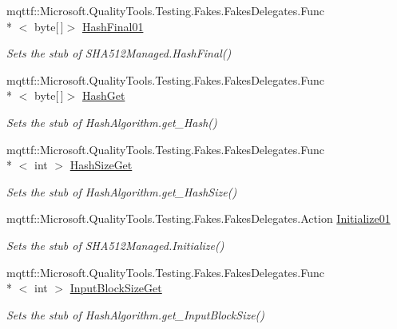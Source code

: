 \begin{DoxyCompactItemize}
mqttf\-::\-Microsoft.\-Quality\-Tools.\-Testing.\-Fakes.\-Fakes\-Delegates.\-Func\\*
$<$ byte\mbox{[}$\,$\mbox{]}$>$ \hyperlink{class_system_1_1_security_1_1_cryptography_1_1_fakes_1_1_stub_s_h_a512_managed_a7582484914dab4c2f70426f1475b9faa}{Hash\-Final01}
\begin{DoxyCompactList}\small\item\em Sets the stub of S\-H\-A512\-Managed.\-Hash\-Final()\end{DoxyCompactList}\item 
mqttf\-::\-Microsoft.\-Quality\-Tools.\-Testing.\-Fakes.\-Fakes\-Delegates.\-Func\\*
$<$ byte\mbox{[}$\,$\mbox{]}$>$ \hyperlink{class_system_1_1_security_1_1_cryptography_1_1_fakes_1_1_stub_s_h_a512_managed_a5c650bbc82b8839d0ab0e9fd199296c5}{Hash\-Get}
\begin{DoxyCompactList}\small\item\em Sets the stub of Hash\-Algorithm.\-get\-\_\-\-Hash()\end{DoxyCompactList}\item 
mqttf\-::\-Microsoft.\-Quality\-Tools.\-Testing.\-Fakes.\-Fakes\-Delegates.\-Func\\*
$<$ int $>$ \hyperlink{class_system_1_1_security_1_1_cryptography_1_1_fakes_1_1_stub_s_h_a512_managed_a7a8196cc7239713d9d8c2e526e75ad1e}{Hash\-Size\-Get}
\begin{DoxyCompactList}\small\item\em Sets the stub of Hash\-Algorithm.\-get\-\_\-\-Hash\-Size()\end{DoxyCompactList}\item 
mqttf\-::\-Microsoft.\-Quality\-Tools.\-Testing.\-Fakes.\-Fakes\-Delegates.\-Action \hyperlink{class_system_1_1_security_1_1_cryptography_1_1_fakes_1_1_stub_s_h_a512_managed_a1f756871d6ad93a59533054b6f9efbe2}{Initialize01}
\begin{DoxyCompactList}\small\item\em Sets the stub of S\-H\-A512\-Managed.\-Initialize()\end{DoxyCompactList}\item 
mqttf\-::\-Microsoft.\-Quality\-Tools.\-Testing.\-Fakes.\-Fakes\-Delegates.\-Func\\*
$<$ int $>$ \hyperlink{class_system_1_1_security_1_1_cryptography_1_1_fakes_1_1_stub_s_h_a512_managed_a2c0acd2bbf0368199c628775b816dfef}{Input\-Block\-Size\-Get}
\begin{DoxyCompactList}\small\item\em Sets the stub of Hash\-Algorithm.\-get\-\_\-\-Input\-Block\-Size()\end{DoxyCompactList}\item 

\end{DoxyCompactItemize}
